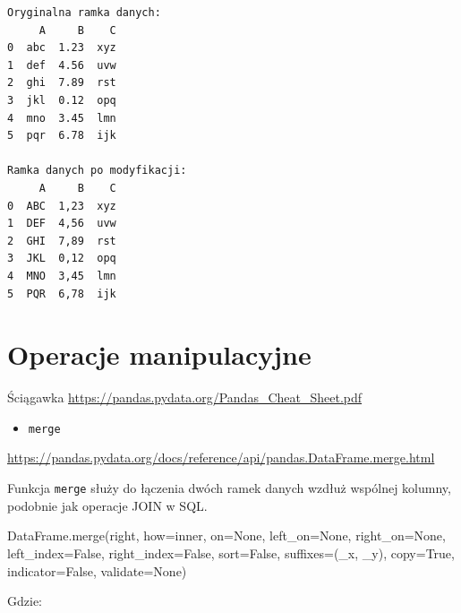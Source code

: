 \documentclass[
  polish,
  letterpaper,
  DIV=11,
  numbers=noendperiod]{scrreprt}
\newenvironment{Shaded}{\begin{snugshade}}{\end{snugshade}}
\newcommand{\NormalTok}[1]{\textcolor[rgb]{0.00,0.23,0.31}{#1}}
\newcommand{\OperatorTok}[1]{\textcolor[rgb]{0.37,0.37,0.37}{#1}}
\newcommand{\StringTok}[1]{\textcolor[rgb]{0.13,0.47,0.30}{#1}}
\newcommand{\VariableTok}[1]{\textcolor[rgb]{0.07,0.07,0.07}{#1}}
\providecommand{\tightlist}{%
  \setlength{\itemsep}{0pt}\setlength{\parskip}{0pt}}
\begin{document}
\begin{verbatim}
Oryginalna ramka danych:
     A     B    C
0  abc  1.23  xyz
1  def  4.56  uvw
2  ghi  7.89  rst
3  jkl  0.12  opq
4  mno  3.45  lmn
5  pqr  6.78  ijk

Ramka danych po modyfikacji:
     A     B    C
0  ABC  1,23  xyz
1  DEF  4,56  uvw
2  GHI  7,89  rst
3  JKL  0,12  opq
4  MNO  3,45  lmn
5  PQR  6,78  ijk
\end{verbatim}

\section{Operacje manipulacyjne}\label{operacje-manipulacyjne}

Ściągawka \url{https://pandas.pydata.org/Pandas_Cheat_Sheet.pdf}

\begin{itemize}
\tightlist
\item
  \texttt{merge}
\end{itemize}

\url{https://pandas.pydata.org/docs/reference/api/pandas.DataFrame.merge.html}

Funkcja \texttt{merge} służy do łączenia dwóch ramek danych wzdłuż
wspólnej kolumny, podobnie jak operacje JOIN w SQL.

\begin{Shaded}
\begin{Highlighting}[]
\NormalTok{DataFrame.merge(right, how}\OperatorTok{=}\StringTok{\textquotesingle{}inner\textquotesingle{}}\NormalTok{, on}\OperatorTok{=}\VariableTok{None}\NormalTok{, left\_on}\OperatorTok{=}\VariableTok{None}\NormalTok{, right\_on}\OperatorTok{=}\VariableTok{None}\NormalTok{,}
\NormalTok{                left\_index}\OperatorTok{=}\VariableTok{False}\NormalTok{, right\_index}\OperatorTok{=}\VariableTok{False}\NormalTok{, sort}\OperatorTok{=}\VariableTok{False}\NormalTok{,}
\NormalTok{                suffixes}\OperatorTok{=}\NormalTok{(}\StringTok{\textquotesingle{}\_x\textquotesingle{}}\NormalTok{, }\StringTok{\textquotesingle{}\_y\textquotesingle{}}\NormalTok{), copy}\OperatorTok{=}\VariableTok{True}\NormalTok{, indicator}\OperatorTok{=}\VariableTok{False}\NormalTok{, validate}\OperatorTok{=}\VariableTok{None}\NormalTok{)}
\end{Highlighting}
\end{Shaded}

Gdzie:
\end{document}
